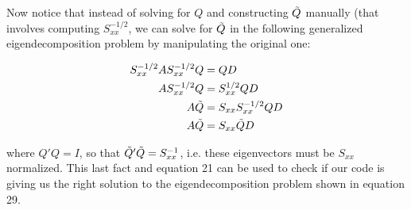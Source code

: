 \documentclass[12pt]{article}
\begin{document}
Now notice that instead of solving for $Q$ and constructing $\Tilde{Q}$ manually (that involves computing $S_{xx}^{-1/2}$, we can solve for $\Tilde{Q}$ in the following generalized eigendecomposition problem by manipulating the original one:

\begin{align}
    S_{xx}^{-1/2} A     S_{xx}^{-1/2} Q &= Q D \\
    A  S_{xx}^{-1/2} Q &=     S_{xx}^{1/2} Q D \\
    A \Tilde{Q} &= S_{xx}     S_{xx}^{-1/2} Q D \\
    A \Tilde{Q} &= S_{xx} \Tilde{Q} D 
\end{align}

where $Q'Q = I$, so that $\Tilde{Q}'\Tilde{Q} = S_{xx}^{-1}$, i.e. these eigenvectors must be $S_{xx}$ normalized. This last fact and equation 21 can be used to check if our code is giving us the right solution to the eigendecomposition problem shown in equation 29. 
\end{document}
